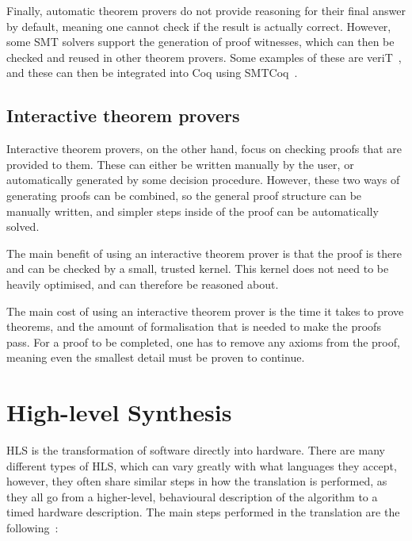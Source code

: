 Finally, automatic theorem provers do not provide reasoning for their final answer by default,
meaning one cannot check if the result is actually correct.  However, some SMT solvers support the
generation of proof witnesses, which can then be checked and reused in other theorem provers.  Some
examples of these are veriT~\cite{bouton09}, and these can then be integrated into Coq using
SMTCoq~\cite{armand11_modul_integ_sat_smt_solver}.

\subsection{Interactive theorem provers}%
\label{sec:background:interactive}

Interactive theorem provers, on the other hand, focus on checking proofs that are provided to them.
These can either be written manually by the user, or automatically generated by some decision
procedure.  However, these two ways of generating proofs can be combined, so the general proof
structure can be manually written, and simpler steps inside of the proof can be automatically
solved.

The main benefit of using an interactive theorem prover is that the proof is there and can be
checked by a small, trusted kernel.  This kernel does not need to be heavily optimised, and can
therefore be reasoned about.

The main cost of using an interactive theorem prover is the time it takes to prove theorems, and the
amount of formalisation that is needed to make the proofs pass.  For a proof to be completed, one
has to remove any axioms from the proof, meaning even the smallest detail must be proven to
continue.

\section{High-level Synthesis}%
\label{sec:background:hls}

\Gls{HLS} is the transformation of software directly into hardware.  There are many different types of
\gls{HLS}, which can vary greatly with what languages they accept, however, they often share similar
steps in how the translation is performed, as they all go from a higher-level, behavioural
description of the algorithm to a timed hardware description.  The main steps performed in the
translation are the following~\cite{coussy09_introd_to_high_level_synth,canis13_legup}:

